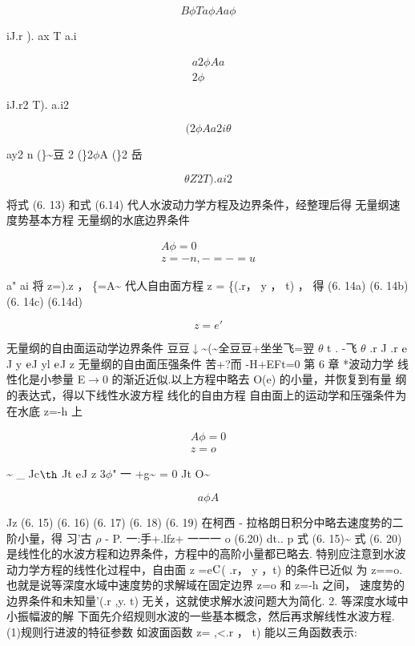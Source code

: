 \[B\phi  T a\phi  Aa\phi \]

iJ.r ). ax T a.i

\begin{gather*}
a 2 \phi  A a\\
2 \phi 
\end{gather*}

iJ.r2 T). a.i2

\[(2\phi A a2 i\theta \]

ay2 n (\}\textasciitilde{}豆 2 (\}2$\phi$A (\}2 岳

\[\theta  Z2 T). ai2\]

将式 (6. 13) 和式 (6.14) 代人水波动力学方程及边界条件，经整理后得 无量纲速度势基本方程 无量纲的水底边界条件

\begin{gather*}
A\phi =0\\
z =-n , - = - = u
\end{gather*}

a" ai 将 z=).z ， \{=A\textasciitilde{} 代人自由面方程 z = \{(.r， y ， t) ， 得 (6. 14a) (6. 14b) (6. 14c) (6.14d)

\[z = e'\]

无量纲的自由面运动学边界条件 豆豆$\downarrow$\textasciitilde{}(\textasciitilde{}全豆豆+坐坐飞=翌 $\theta$ t . -飞 $\theta$ .r J .r ${\rm e}$J y ${\rm e}$J yl ${\rm e}$J z 无量纲的自由面压强条件 苦+?而 -H+EFt=0 第 6 章 *波动力学 线性化是小参量 E$\rightarrow$0 的渐近近似.以上方程中略去 O(e) 的小量，并恢复到有量 纲的表达式，得以下线性水波方程 线化的自由方程 自由面上的运动学和压强条件为 在水底 z=-h 上

\begin{gather*}
A\phi =0\\
z=o
\end{gather*}

\textasciitilde{} \_ Jc${\rm þ}$ Jt ${\rm e}$J z 3$\phi$" 一 +g\textasciitilde{} = 0 Jt O\textasciitilde{}

\[a\phi A\]

Jz (6. 15) (6. 16) (6. 17) (6. 18) (6. 19) 在柯西 - 拉格朗日积分中略去速度势的二阶小量，得 习'古 $\rho$ - P. 一:手+.lfz+ 一一一 o (6.20) dt.. p 式 (6. 15)\textasciitilde{} 式 (6. 20) 是线性化的水波方程和边界条件，方程中的高阶小量都已略去. 特别应注意到水波动力学方程的线性化过程中，自由面 z =e${\rm C}$( .r， y ，t) 的条件已近似 为 z==o. 也就是说等深度水域中速度势的求解域在固定边界 z=o 和 z=-h 之间， 速度势的边界条件和未知量'(.r ,y. t) 无关，这就使求解水波问题大为简化. 2. 等深度水域中小振幅波的解 下面先介绍规则水波的一些基本概念，然后再求解线性水波方程. (1)规则行进波的特征参数 如波面函数 z= ,<.r ， t) 能以三角函数表示:

